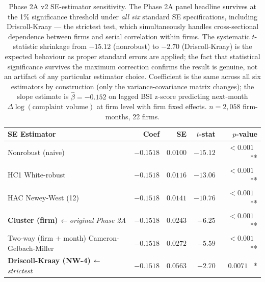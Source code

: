 \documentclass[11pt,a4paper]{article}
\begin{document}
\begin{table}[h]
\centering\footnotesize
\begin{tabular}{lrrrr}
\toprule
\textbf{SE Estimator} & \textbf{Coef} & \textbf{SE} & \textbf{$t$-stat} & \textbf{$p$-value} \\
\midrule
Nonrobust (naive)                                  & $-0.1518$ & $0.0100$ & $-15.12$ & $< 0.001$ \, ** \\
HC1 White-robust                                   & $-0.1518$ & $0.0116$ & $-13.06$ & $< 0.001$ \, ** \\
HAC Newey-West (12)                                & $-0.1518$ & $0.0141$ & $-10.76$ & $< 0.001$ \, ** \\
\textbf{Cluster (firm)} \emph{← original Phase 2A} & $-0.1518$ & $0.0243$ & $-6.25$  & $< 0.001$ \, ** \\
Two-way (firm $+$ month) Cameron-Gelbach-Miller    & $-0.1518$ & $0.0272$ & $-5.59$  & $< 0.001$ \, ** \\
\textbf{Driscoll-Kraay (NW-4)} \emph{← strictest}  & $-0.1518$ & $0.0563$ & $-2.70$  & $\mathbf{0.0071}$ \, * \\
\bottomrule
\end{tabular}
\caption{Phase 2A v2 SE-estimator sensitivity. The Phase 2A panel headline survives at the 1\% significance threshold under \emph{all six} standard SE specifications, including Driscoll-Kraay --- the strictest test, which simultaneously handles cross-sectional dependence between firms and serial correlation within firms. The systematic $t$-statistic shrinkage from $-15.12$ (nonrobust) to $-2.70$ (Driscoll-Kraay) is the expected behaviour as proper standard errors are applied; the fact that statistical significance survives the maximum correction confirms the result is genuine, not an artifact of any particular estimator choice. Coefficient is the same across all six estimators by construction (only the variance-covariance matrix changes); the slope estimate is $\hat{\beta} = -0.152$ on lagged BSI z-score predicting next-month $\Delta\log(\text{complaint volume})$ at firm level with firm fixed effects. $n = 2{,}058$ firm-months, 22 firms.}
\label{tab:phase2A_v2_se}
\end{table}
\end{document}
